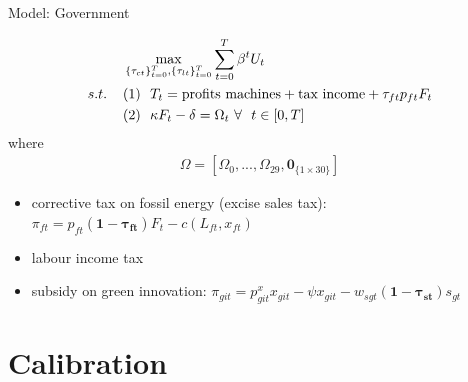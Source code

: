 \documentclass[11pt,aspectratio=169]{beamer}
\begin{document}
\begin{frame}{Model: Government}

\begin{align*}
&\max_{\{\tau_{ct}\}_{t=0}^{T}, \{\tau_{lt}\}_{t=0}^{T}} \sum_{t=0}^{T}\beta^t U_{t}\\
s.t. \hspace{4mm}
&(1)\ \ T_t= \text{profits machines}+\text{tax income}+\tau_{ft}p_{ft}F_{t}\\
&
(2)\ \ \kappa F_t-\delta =\Omega_t\  \forall\ \  t\in[0,T]
\end{align*}
where 
\begin{align*}
\Omega =\left[\Omega_0,..., \Omega_{29}, \pmb{0}_{\{1\times 30\}}\right]
\end{align*}
	\begin{itemize}
	\item corrective tax on fossil energy (excise sales tax): $\pi_{ft}=p_{ft}\pmb{(1-\tau_{ft})}F_t-c(L_{ft}, x_{ft})$
	\item labour income tax
	\item subsidy on green innovation: $\pi_{git}=p_{git}^x x_{git}-\psi x_{git}-w_{sgt}\pmb{(1-\tau_{st})}s_{gt}$
\end{itemize}
\end{frame}

\section{Calibration}
\end{document}
